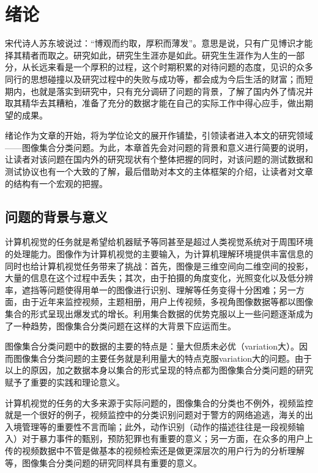 \chapter{绪\hspace{1em}论}
\label{cha:intro}
宋代诗人苏东坡说过：“博观而约取，厚积而薄发”。意思是说，只有广见博识才能择其精者而取之。研究如此，研究生生涯亦是如此。研究生生涯作为人生的一部分，从长远来看是一个厚积的过程，这个时期积累的对待问题的态度，见识的众多同行的思想碰撞以及研究过程中的失败与成功等，都会成为今后生活的财富；而短期内，也就是落实到研究中，只有充分调研了问题的背景，了解了国内外了情况并取其精华去其糟粕，准备了充分的数据才能在自己的实际工作中得心应手，做出期望的成果。

绪论作为文章的开始，将为学位论文的展开作铺垫，引领读者进入本文的研究领域——图像集合分类问题。为此，本章首先会对问题的背景和意义进行简要的说明，让读者对该问题在国内外的研究现状有个整体把握的同时，对该问题的测试数据和测试协议也有一个大致的了解，最后借助对本文的主体框架的介绍，让读者对文章的结构有一个宏观的把握。
\section{问题的背景与意义}
\label{sec:background}
计算机视觉的任务就是希望给机器赋予等同甚至是超过人类视觉系统对于周围环境的处理能力。图像作为计算机视觉的主要输入，为计算机理解环境提供丰富信息的同时也给计算机视觉任务带来了挑战：首先，图像是三维空间向二维空间的投影，大量的信息在这个过程中丢失；其次，由于拍摄的角度变化，光照变化以及低分辨率，遮挡等问题使得用单一的图像进行识别、理解等任务变得十分困难；另一方面，由于近年来监控视频，主题相册，用户上传视频，多视角图像数据等都以图像集合的形式呈现出爆发式的增长。利用集合数据的优势克服以上一些问题逐渐成为了一种趋势，图像集合分类问题在这样的大背景下应运而生。

图像集合分类问题中的数据的主要的特点是：量大但质未必优（variation大）。因而图像集合分类问题的主要任务就是利用量大的特点克服variation大的问题。由于以上的原因，加之数据本身以集合的形式呈现的特点都为图像集合分类问题的研究赋予了重要的实践和理论意义。

计算机视觉的任务的大多来源于实际问题的，图像集合的分类也不例外，视频监控就是一个很好的例子，视频监控中的分类识别问题对于警方的网络追逃，海关的出入境管理等的重要性不言而喻；此外，动作识别（动作的描述往往是一段视频输入）对于暴力事件的甄别，预防犯罪也有重要的意义；另一方面，在众多的用户上传的视频数据中不管是做基本的视频检索还是做更深层次的用户行为的分析理解等，图像集合分类问题的研究同样具有重要的意义。

